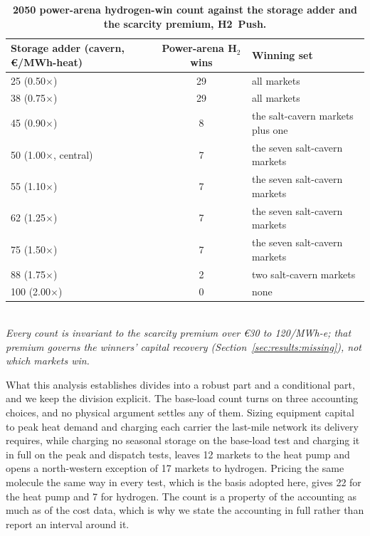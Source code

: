 \begin{table}[htbp]
\centering
\caption{\textbf{2050 power-arena hydrogen-win count against the storage adder and the
 scarcity premium, H2~Push.}}
 \par{}
\label{tab:cavern_sweep}
\small
\begin{tabular}{lcl}
\toprule
Storage adder (cavern, \euro{}/MWh-heat) & Power-arena H$_2$ wins & Winning set \\
\midrule
25 (0.50$\times$) & 29 & all markets \\
38 (0.75$\times$) & 29 & all markets \\
45 (0.90$\times$) & 8 & the salt-cavern markets plus one \\
50 (1.00$\times$, central) & 7 & the seven salt-cavern markets \\
55 (1.10$\times$) & 7 & the seven salt-cavern markets \\
62 (1.25$\times$) & 7 & the seven salt-cavern markets \\
75 (1.50$\times$) & 7 & the seven salt-cavern markets \\
88 (1.75$\times$) & 2 & two salt-cavern markets \\
100 (2.00$\times$) & 0 & none \\
\bottomrule
\end{tabular}\\[4pt]
\footnotesize{\textit{Every count is invariant to the scarcity premium over \euro{}30 to 120/MWh-e; that premium governs the winners' capital recovery
(Section~\ref{sec:results:missing}), not which markets win.}}
 \par{}
\end{table}

What this analysis establishes divides into a robust part and a conditional part, and
we keep the division explicit. The base-load count turns on three accounting choices,
and no physical argument settles any of them. Sizing equipment capital to peak heat
demand and charging each carrier the last-mile network its delivery requires, while
charging no seasonal storage on the base-load test and charging it in full on the peak
and dispatch tests, leaves 12 markets to the heat pump and opens a north-western
exception of 17 markets to hydrogen. Pricing the same molecule the same way in every
test, which is the basis adopted here, gives 22 for the heat pump and 7 for hydrogen.
The count is a property of the accounting as much as of the cost data, which is why we
state the accounting in full rather than report an interval around it.

